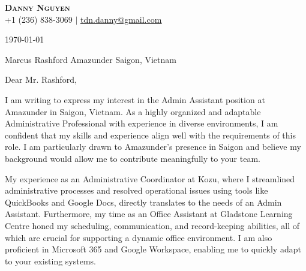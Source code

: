 \documentclass[letterpaper,11pt]{article}
\begin{document}
\begin{center}
\textbf{\Huge \scshape Danny Nguyen} \\ \vspace{1pt}
\small +1 (236) 838-3069 $|$ \href{mailto:tdn.danny@gmail.com}{\underline{tdn.danny@gmail.com}}
\end{center}

\today
\vspace{20pt}

Marcus Rashford
Amazunder
Saigon, Vietnam
\vspace{20pt}

Dear Mr. Rashford,
\vspace{10pt}

I am writing to express my interest in the Admin Assistant position at Amazunder in Saigon, Vietnam. As a highly organized and adaptable Administrative Professional with experience in diverse environments, I am confident that my skills and experience align well with the requirements of this role. I am particularly drawn to Amazunder's presence in Saigon and believe my background would allow me to contribute meaningfully to your team.
\vspace{10pt}

My experience as an Administrative Coordinator at Kozu, where I streamlined administrative processes and resolved operational issues using tools like QuickBooks and Google Docs, directly translates to the needs of an Admin Assistant. Furthermore, my time as an Office Assistant at Gladstone Learning Centre honed my scheduling, communication, and record-keeping abilities, all of which are crucial for supporting a dynamic office environment. I am also proficient in Microsoft 365 and Google Workspace, enabling me to quickly adapt to your existing systems.
\vspace{10pt}
\end{document}
